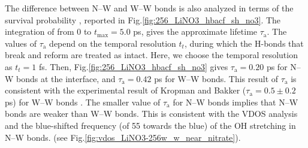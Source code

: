 %
The difference between N--W and W--W bonds 
is also analyzed in terms of the survival probability \SHB\cite{AKS86,JT90,AL96}, 
reported in Fig.\thinspace\ref {fig:256_LiNO3_hbacf_sh_no3}.
The integration of \SHB from 0 to $t_{\max}=5.0$ ps\cite{Steinel2004}, gives the approximate lifetime $\tau_\text{a}$\cite{Chowdhuri2002}. 
The values of $\tau_{\text{a}}$ depend on the temporal resolution $t_t$, during which the H-bonds that break and reform are treated as intact\cite{AL00}. 
%
Here, we choose the temporal resolution as $t_t=1$ fs. 
Then, Fig.\thinspace\ref {fig:256_LiNO3_hbacf_sh_no3} gives $\tau_\text{a}=0.20$ ps for N--W bonds at the interface, 
and $\tau_\text{a}=0.42$ ps for W--W bonds.
This result of $\tau_\text{a}$ is consistent with the experimental result of Kropman and Bakker ($\tau_\text{a}=0.5\pm0.2$ ps) for W--W bonds 
\cite{Kropman2001}. %
The smaller value of $\tau_\text{a}$ for N--W bonds implies that N--W bonds are weaker than W--W bonds. 
This is consistent with the VDOS analysis and the blue-shifted frequency (of 55 \cm towards the blue) of the OH stretching in N--W bonds. 
(see Fig.\thinspace\ref{fig:vdos_LiNO3-256w_w_near_nitrate}). 


